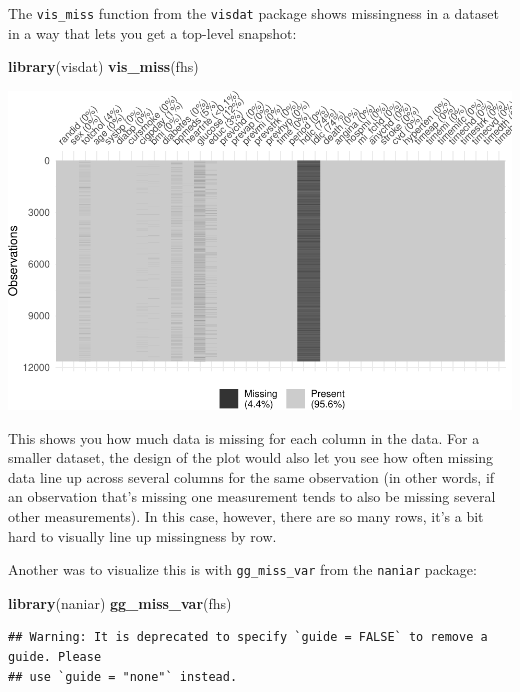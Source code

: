 \documentclass[
]{book}
\newenvironment{Shaded}{\begin{snugshade}}{\end{snugshade}}
\newcommand{\KeywordTok}[1]{\textcolor[rgb]{0.13,0.29,0.53}{\textbf{#1}}}
\newcommand{\NormalTok}[1]{#1}
\begin{document}
The \texttt{vis\_miss} function from the \texttt{visdat} package shows missingness in a dataset in a way that lets you
get a top-level snapshot:

\begin{Shaded}
\begin{Highlighting}[]
\KeywordTok{library}\NormalTok{(visdat)}
\KeywordTok{vis_miss}\NormalTok{(fhs)}
\end{Highlighting}
\end{Shaded}

\includegraphics{adv_epi_analysis_files/figure-latex/unnamed-chunk-173-1.pdf}

This shows you how much data is missing for each column in the data. For a smaller dataset, the design of the plot would also let you see how often missing data line up across several columns for the same observation (in other words, if an observation that's missing one measurement tends to also be missing several other measurements). In this case, however, there are so many rows, it's a bit hard to visually line up missingness by row.

Another was to visualize this is with \texttt{gg\_miss\_var} from the \texttt{naniar} package:

\begin{Shaded}
\begin{Highlighting}[]
\KeywordTok{library}\NormalTok{(naniar)}
\KeywordTok{gg_miss_var}\NormalTok{(fhs)}
\end{Highlighting}
\end{Shaded}

\begin{verbatim}
## Warning: It is deprecated to specify `guide = FALSE` to remove a guide. Please
## use `guide = "none"` instead.
\end{verbatim}
\end{document}
